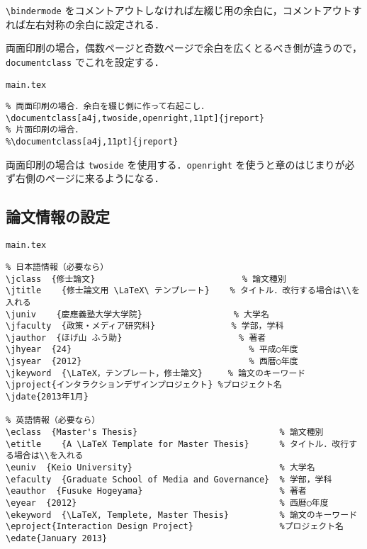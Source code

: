 \verb|\bindermode| をコメントアウトしなければ左綴じ用の余白に，コメントアウトすれば左右対称の余白に設定される．

両面印刷の場合，偶数ページと奇数ページで余白を広くとるべき側が違うので，\verb|documentclass| でこれを設定する．

\begin{itembox}[l]{{\tt main.tex}}
\begin{verbatim}
% 両面印刷の場合．余白を綴じ側に作って右起こし．
\documentclass[a4j,twoside,openright,11pt]{jreport}
% 片面印刷の場合．
%\documentclass[a4j,11pt]{jreport}
\end{verbatim}
\end{itembox}

両面印刷の場合は \verb|twoside| を使用する．\verb|openright| を使うと章のはじまりが必ず右側のページに来るようになる．

\subsection{論文情報の設定}
\label{sec:meta}

\begin{itembox}[l]{{\tt main.tex}}
\begin{verbatim}
% 日本語情報（必要なら）
\jclass  {修士論文}                             % 論文種別
\jtitle    {修士論文用 \LaTeX\ テンプレート}    % タイトル．改行する場合は\\を入れる
\juniv    {慶應義塾大学大学院}                  % 大学名
\jfaculty  {政策・メディア研究科}               % 学部，学科
\jauthor  {ほげ山 ふう助}                       % 著者
\jhyear  {24}                                   % 平成○年度
\jsyear  {2012}                                 % 西暦○年度
\jkeyword  {\LaTeX，テンプレート，修士論文}     % 論文のキーワード
\jproject{インタラクションデザインプロジェクト} %プロジェクト名
\jdate{2013年1月}

% 英語情報（必要なら）
\eclass  {Master's Thesis}                            % 論文種別
\etitle    {A \LaTeX Template for Master Thesis}      % タイトル．改行する場合は\\を入れる
\euniv  {Keio University}                             % 大学名
\efaculty  {Graduate School of Media and Governance}  % 学部，学科
\eauthor  {Fusuke Hogeyama}                           % 著者
\eyear  {2012}                                        % 西暦○年度
\ekeyword  {\LaTeX, Templete, Master Thesis}          % 論文のキーワード
\eproject{Interaction Design Project}                 %プロジェクト名
\edate{January 2013}
\end{verbatim}
\end{itembox}

